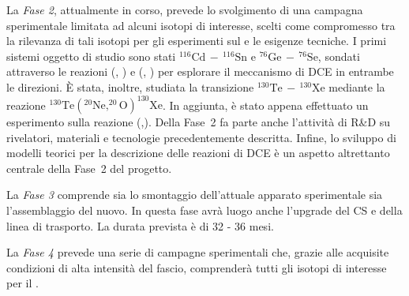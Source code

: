 La \emph{Fase 2}, attualmente in corso, prevede lo svolgimento di una campagna sperimentale limitata ad alcuni isotopi di interesse, scelti come compromesso tra la rilevanza di tali isotopi per gli esperimenti sul \doppiobeta{} e le esigenze tecniche. I primi sistemi oggetto di studio sono stati $^{116}\mbox{Cd}\,  - \, ^{116}\mbox{Sn} $ e $^{76}\mbox{Ge}\,  - \, ^{76}\mbox{Se} $, sondati attraverso le reazioni (, ) e (, ) per esplorare il meccanismo di DCE in entrambe le direzioni. 
È stata, inoltre, studiata la transizione $^{130}\mbox{Te}\,  - \, ^{130}\mbox{Xe} $ mediante la reazione $^{130}\mbox{Te}  ( ^{20}\mbox{Ne}, ^{20}\mbox{O} )  ^{130}\mbox{Xe} $.
In aggiunta, è stato appena effettuato un esperimento sulla reazione (,). 
Della Fase~2 fa parte anche l'attività di R\&D su rivelatori, materiali e tecnologie precedentemente descritta.
Infine, lo sviluppo di modelli teorici per la descrizione delle reazioni di DCE è un aspetto altrettanto centrale della Fase~2 del progetto.

La \emph{Fase 3} comprende sia lo smontaggio dell'attuale apparato sperimentale sia l'assemblaggio del nuovo. In questa fase avrà luogo anche l'upgrade del CS e della linea di trasporto. La durata prevista è di 32 - 36 mesi.


La \emph{Fase 4} prevede una serie di campagne sperimentali che, grazie alle acquisite condizioni di alta intensità del fascio, comprenderà tutti gli isotopi di interesse per il \doppiobeta{}. 










\clearpage
